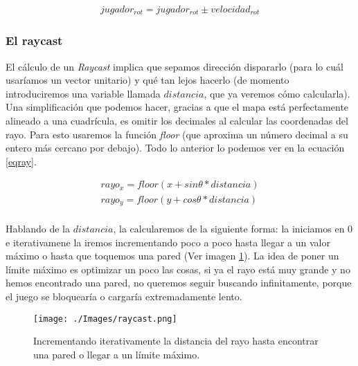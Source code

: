 \begin{equation}
\begin{aligned}
\label{eq-rot}
jugador_{rot} = jugador_{rot} \pm velocidad_{rot}
\end{aligned}
\end{equation}



\newpage

\subsubsection{El raycast}

El cálculo de un \emph{Raycast} implica que sepamos dirección dispararlo (para lo cuál usaríamos un vector unitario) y qué tan lejos hacerlo (de momento introduciremos una variable llamada $distancia$, que ya veremos cómo calcularla). Una simplificación que podemos hacer, gracias a que el mapa está perfectamente alineado a una cuadrícula, es omitir los decimales al calcular las coordenadas del rayo. Para esto usaremos la función \emph{floor} (que aproxima un número decimal a su entero más cercano por debajo). Todo lo anterior lo podemos ver en la ecuación \ref{eqray}.

\begin{equation}
\begin{aligned}
\label{eqray}
rayo_x = floor(x + sin \theta * distancia)\\
rayo_y = floor(y + cos \theta * distancia)\\
\end{aligned}
\end{equation}

Hablando de la $distancia$, la calcularemos de la siguiente forma: la iniciamos en 0 e iterativamene la iremos incrementando poco a poco hasta llegar a un valor máximo o hasta que toquemos una pared (Ver imagen \ref{raycastit}). La idea de poner un límite máximo es optimizar un poco las cosas, si ya el rayo está muy grande y no hemos encontrado una pared, no queremos seguir buscando infinitamente, porque el juego se bloquearía o cargaría extremadamente lento.

\begin{figure}[h!]
	\centering
	\texttt{[image: ./Images/raycast.png]}
	\caption{Incrementando iterativamente la distancia del rayo hasta encontrar una pared o llegar a un límite máximo.}
	\label{raycastit}
\end{figure}

